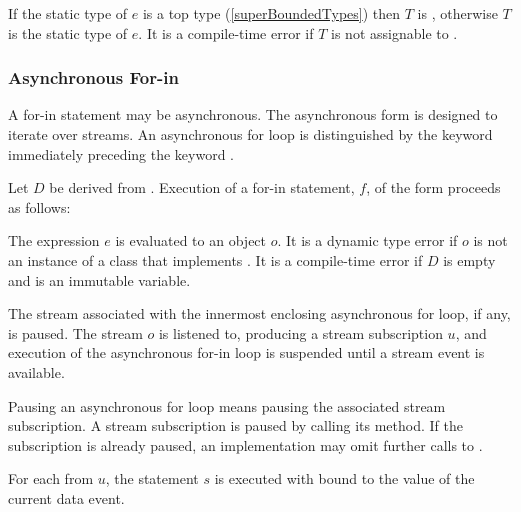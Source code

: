 \documentclass[makeidx]{article}
\begin{document}
{\noindent
If the static type of $e$ is a top type
(\ref{superBoundedTypes})
then $T$ is ,
otherwise $T$ is the static type of $e$.
It is a compile-time error if $T$ is not assignable to
.



\subsubsection{Asynchronous For-in}

\LMHash{}%
A for-in statement may be asynchronous.
The asynchronous form is designed to iterate over streams.
An asynchronous for loop is distinguished by
the keyword \AWAIT{} immediately preceding the keyword \FOR.

\LMHash{}%
Let $D$ be derived from .
Execution of a for-in statement, $f$, of the form
proceeds as follows:

\LMHash{}%
The expression $e$ is evaluated to an object $o$.
It is a dynamic type error if $o$ is not an instance of
a class that implements .
It is a compile-time error if $D$ is empty and \id{} is an immutable variable.

\LMHash{}%
The stream associated with the innermost enclosing asynchronous for loop,
if any, is paused.
The stream $o$ is listened to, producing a stream subscription $u$,
and execution of the asynchronous for-in loop is suspended
until a stream event is available.

Pausing an asynchronous for loop means pausing
the associated stream subscription.
A stream subscription is paused by calling its  method.
If the subscription is already paused, an implementation may omit
further calls to .


\LMHash{}%
For each  from $u$,
the statement $s$ is executed with \id{} bound to
the value of the current data event.

}
\end{document}
